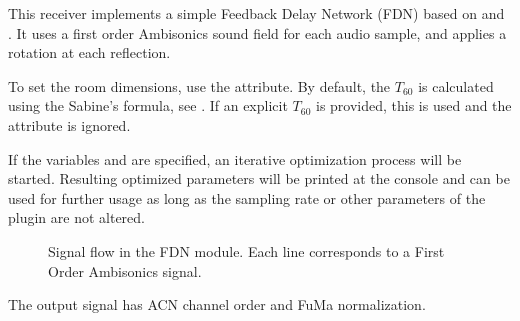 This receiver implements a simple Feedback Delay Network (FDN) based
on \citet{Schroeder1962} and \citet{Rocchesso1997}. It uses a first
order Ambisonics sound field for each audio sample, and applies a
rotation at each reflection.

To set the room
dimensions, use the  attribute. By default, the
$T_{60}$ is calculated using the Sabine's formula, see
. If an explicit $T_{60}$ is provided, this is used
and the  attribute is ignored.

If the variables  and  are specified, an
iterative optimization process will be started. Resulting optimized
parameters will be printed at the console and can be used for further
usage as long as the sampling rate or other parameters of the plugin
are not altered.

\begin{figure}[htb]
\centering
{}
\caption{Signal flow in the FDN module. Each line corresponds to a First Order Ambisonics signal.}
\label{fig:fdn}
\end{figure}



The output signal has ACN channel order and FuMa normalization.
